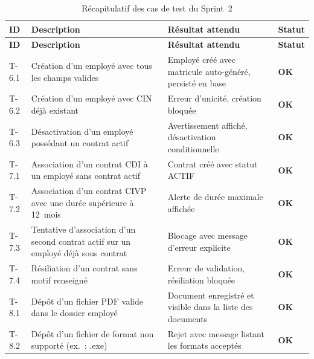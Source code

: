 \begin{xltabular}{\textwidth}{|p{1.5cm}|X|p{4cm}|p{1.5cm}|}
\hline
{}
\textbf{ID} & \textbf{Description} & \textbf{Résultat attendu} & \textbf{Statut} \\ \hline
\endfirsthead
\hline
{}
\textbf{ID} & \textbf{Description} & \textbf{Résultat attendu} & \textbf{Statut} \\ \hline
\endhead
\hline
\endfoot
\hline
\caption{Récapitulatif des cas de test du Sprint~2}
\label{tab:tests-sprint2}
\endlastfoot

T-6.1 & Création d'un employé avec tous les champs valides
       & Employé créé avec matricule auto-généré, persisté en base
       & \textcolor{green!60!black}{\textbf{OK}} \\ \hline

T-6.2 & Création d'un employé avec CIN déjà existant
       & Erreur d'unicité, création bloquée
       & \textcolor{green!60!black}{\textbf{OK}} \\ \hline

T-6.3 & Désactivation d'un employé possédant un contrat actif
       & Avertissement affiché, désactivation conditionnelle
       & \textcolor{green!60!black}{\textbf{OK}} \\ \hline

T-7.1 & Association d'un contrat CDI à un employé sans contrat actif
       & Contrat créé avec statut ACTIF
       & \textcolor{green!60!black}{\textbf{OK}} \\ \hline

T-7.2 & Association d'un contrat CIVP avec une durée supérieure à 12~mois
       & Alerte de durée maximale affichée
       & \textcolor{green!60!black}{\textbf{OK}} \\ \hline

T-7.3 & Tentative d'association d'un second contrat actif sur un employé
        déjà sous contrat
       & Blocage avec message d'erreur explicite
       & \textcolor{green!60!black}{\textbf{OK}} \\ \hline

T-7.4 & Résiliation d'un contrat sans motif renseigné
       & Erreur de validation, résiliation bloquée
       & \textcolor{green!60!black}{\textbf{OK}} \\ \hline

T-8.1 & Dépôt d'un fichier PDF valide dans le dossier employé
       & Document enregistré et visible dans la liste des documents
       & \textcolor{green!60!black}{\textbf{OK}} \\ \hline

T-8.2 & Dépôt d'un fichier de format non supporté (ex.~: .exe)
       & Rejet avec message listant les formats acceptés
       & \textcolor{green!60!black}{\textbf{OK}} \\ \hline

\end{xltabular}
\renewcommand{\arraystretch}{1.0}

